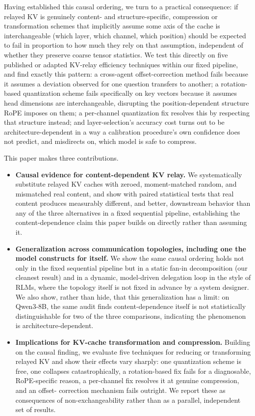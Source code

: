 \documentclass[11pt]{article}
\begin{document}
Having established this causal ordering, we turn to a practical
consequence: if relayed KV is genuinely content- and structure-specific,
compression or transformation schemes that implicitly assume some axis of
the cache is interchangeable (which layer, which channel, which position)
should be expected to fail in proportion to how much they rely on that
assumption, independent of whether they preserve coarse tensor statistics.
We test this directly on five published or adapted KV-relay efficiency
techniques within our fixed pipeline, and find exactly this pattern: a
cross-agent offset-correction method \citep{kvcomm2025} fails because it
assumes a deviation observed for one question transfers to another; a
rotation-based quantization scheme \citep{turboquant2026,polarquant2026}
fails specifically on key vectors because it assumes head dimensions are
interchangeable, disrupting the position-dependent structure RoPE
imposes on them; a per-channel quantization fix \citep{kivi2024} resolves
this by respecting that structure instead; and layer-selection's accuracy
cost turns out to be architecture-dependent in a way a calibration
procedure's own confidence does not predict, and misdirects on, which
model is safe to compress.

This paper makes three contributions.

\begin{itemize}
\item \textbf{Causal evidence for content-dependent KV relay.} We
systematically substitute relayed KV caches with zeroed, moment-matched
random, and mismatched real content, and show with paired statistical
tests that real content produces measurably different, and better,
downstream behavior than any of the three alternatives in a fixed
sequential pipeline, establishing the content-dependence claim this
paper builds on directly rather than assuming it.

\item \textbf{Generalization across communication topologies, including
one the model constructs for itself.} We show the same causal ordering
holds not only in the fixed sequential pipeline but in a static fan-in
decomposition (our cleanest result) and in a dynamic, model-driven
delegation loop in the style of RLMs, where the topology itself is not
fixed in advance by a system designer. We also show, rather than hide,
that this generalization has a limit: on Qwen3-8B, the same audit finds
content-dependence itself is not statistically distinguishable for two
of the three comparisons, indicating the phenomenon is
architecture-dependent.

\item \textbf{Implications for KV-cache transformation and compression.}
Building on the causal finding, we evaluate five techniques for reducing
or transforming relayed KV and show their effects vary sharply: one
quantization scheme is free, one collapses catastrophically, a
rotation-based fix fails for a diagnosable, RoPE-specific reason, a
per-channel fix resolves it at genuine compression, and an offset-
correction mechanism fails outright. We report these as consequences of
non-exchangeability rather than as a parallel, independent set of
results.
\end{itemize}
\end{document}
